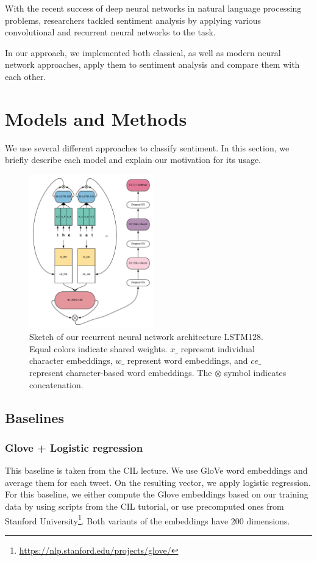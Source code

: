 \documentclass[10pt,conference,compsocconf]{IEEEtran}
\begin{document}
With the recent success of deep neural networks in natural language processing problems, researchers tackled sentiment analysis by applying various convolutional \cite{TextCNN} and recurrent neural networks \cite{rnn} to the task. 

In our approach, we implemented both classical, as well as modern neural network approaches, apply them to sentiment analysis and compare them with each other.

\section{Models and Methods}

We use several different approaches to classify sentiment. In this section, we briefly describe each model and explain our motivation for its usage.

\begin{figure}
\includegraphics[width=0.48\textwidth]{./rnn}
\caption{Sketch of our recurrent neural network architecture LSTM128. Equal colors indicate shared weights. $x\_$ represent individual character embeddings, $w\_$ represent word embeddings, and $ce\_$ represent character-based word embeddings.
The $\otimes$ symbol indicates concatenation.}
\label{fig:arch}
\end{figure}

\subsection{Baselines}

\subsubsection{Glove + Logistic regression}
This baseline is taken from the CIL lecture. We use GloVe word embeddings \cite{pennington2014glove} and average them for each tweet. On the resulting vector, we apply logistic regression. For this baseline, we either compute the Glove embeddings based on our training data by using scripts from the CIL tutorial, or use precomputed ones from Stanford University\footnote{\url{https://nlp.stanford.edu/projects/glove/}}.
Both variants of the embeddings have 200 dimensions.
\end{document}

